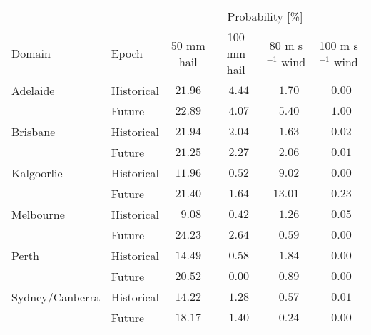 \begin{tabular}{llcccc}
\hline
& & \multicolumn{4}{c}{Probability [\%]} \\ 
Domain & Epoch & 50 mm hail & 100 mm hail & 80 m s$^{-1}$ wind & \multicolumn{1}{c}{100 m s$^{-1}$ wind} \\ 
\hline
Adelaide & Historical  & $21.96$ & $\phantom{0}4.44$ & $\phantom{0}1.70$ & $\phantom{0}0.00$ \\
 & Future  & $22.89$ & $\phantom{0}4.07$ & $\phantom{0}5.40$ & $\phantom{0}1.00$ \\
Brisbane & Historical  & $21.94$ & $\phantom{0}2.04$ & $\phantom{0}1.63$ & $\phantom{0}0.02$ \\
 & Future  & $21.25$ & $\phantom{0}2.27$ & $\phantom{0}2.06$ & $\phantom{0}0.01$ \\
Kalgoorlie & Historical  & $11.96$ & $\phantom{0}0.52$ & $\phantom{0}9.02$ & $\phantom{0}0.00$ \\
 & Future  & $21.40$ & $\phantom{0}1.64$ & $13.01$ & $\phantom{0}0.23$ \\
Melbourne & Historical  & $\phantom{0}9.08$ & $\phantom{0}0.42$ & $\phantom{0}1.26$ & $\phantom{0}0.05$ \\
 & Future  & $24.23$ & $\phantom{0}2.64$ & $\phantom{0}0.59$ & $\phantom{0}0.00$ \\
Perth & Historical  & $14.49$ & $\phantom{0}0.58$ & $\phantom{0}1.84$ & $\phantom{0}0.00$ \\
 & Future  & $20.52$ & $\phantom{0}0.00$ & $\phantom{0}0.89$ & $\phantom{0}0.00$ \\
Sydney/Canberra & Historical  & $14.22$ & $\phantom{0}1.28$ & $\phantom{0}0.57$ & $\phantom{0}0.01$ \\
 & Future  & $18.17$ & $\phantom{0}1.40$ & $\phantom{0}0.24$ & $\phantom{0}0.00$ \\
\hline 
\end{tabular}
